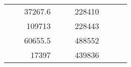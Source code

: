 \begin{table}[H]
\begin{tabular}{|ccrccrccc}
\multicolumn{1}{|c|}{\cellcolor[HTML]{FFFFC7}}                                & \multicolumn{1}{c|}{\cellcolor[HTML]{DAE8FC}}                      & \multicolumn{1}{r|}{\cellcolor[HTML]{DAE8FC}37267.6}   & \multicolumn{1}{c|}{\cellcolor[HTML]{FFFFC7}}                                & \multicolumn{1}{c|}{\cellcolor[HTML]{DAE8FC}}                       & \multicolumn{1}{r|}{\cellcolor[HTML]{DDFDFF}228410}    &                                                                              &                                                                    &                                                        \\ \cline{3-3} \cline{6-6}
\multicolumn{1}{|c|}{\cellcolor[HTML]{FFFFC7}}                                & \multicolumn{1}{c|}{\cellcolor[HTML]{DAE8FC}}                      & \multicolumn{1}{r|}{\cellcolor[HTML]{DDFDFF}109713}    & \multicolumn{1}{c|}{\cellcolor[HTML]{FFFFC7}}                                & \multicolumn{1}{c|}{\cellcolor[HTML]{DAE8FC}}                       & \multicolumn{1}{r|}{\cellcolor[HTML]{DAE8FC}228443}    &                                                                              &                                                                    &                                                        \\ \cline{3-3} \cline{6-6}
\multicolumn{1}{|c|}{\cellcolor[HTML]{FFFFC7}}                                & \multicolumn{1}{c|}{\cellcolor[HTML]{DAE8FC}}                      & \multicolumn{1}{r|}{\cellcolor[HTML]{DAE8FC}60655.5}   & \multicolumn{1}{c|}{\cellcolor[HTML]{FFFFC7}}                                & \multicolumn{1}{c|}{\cellcolor[HTML]{DAE8FC}}                       & \multicolumn{1}{r|}{\cellcolor[HTML]{DDFDFF}488552}    &                                                                              &                                                                    &                                                        \\ \cline{3-3} \cline{6-6}
\multicolumn{1}{|c|}{\cellcolor[HTML]{FFFFC7}}                                & \multicolumn{1}{c|}{\cellcolor[HTML]{DAE8FC}}                      & \multicolumn{1}{r|}{\cellcolor[HTML]{DDFDFF}17397}     & \multicolumn{1}{c|}{\cellcolor[HTML]{FFFFC7}}                                & \multicolumn{1}{c|}{\cellcolor[HTML]{DAE8FC}}                       & \multicolumn{1}{r|}{\cellcolor[HTML]{DAE8FC}439836}    &                                                                              &                                                                    &                                                        \\ \cline{3-3} \cline{6-6}

\end{tabular}
\end{table}

